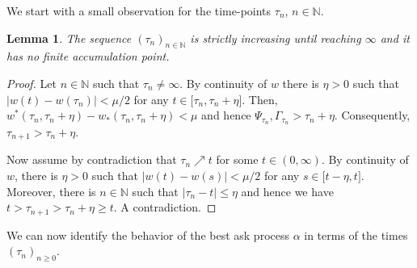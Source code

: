 \documentclass[11pt]{scrartcl}
\newtheorem{lemma}[theorem]{Lemma}
\begin{document}
We start with a small observation for the time-points $\tau_{n}$, $n\in%
\mathbb{N}$.

\begin{lemma}
The sequence $(\tau_{n})_{n\in\mathbb{N}}$ is strictly increasing until
reaching $\infty$ and it has no finite accumulation point.
\end{lemma}

\begin{proof}
Let $n\in\mathbb{N}$ such that $\tau_{n}\neq\infty$. By continuity of $w$ there
is $\eta>0$ such that $|w(t)-w(\tau_{n})|<\mu/2$ for any $t\in\lbrack \tau_{n}%
,\tau_{n}+\eta]$. Then, $w^{\ast}(\tau_{n},\tau_{n}+\eta)-w_{\ast}(\tau_{n},\tau_{n}%
+\eta)<\mu$ and hence $\Psi_{\tau_{n}},\Gamma_{\tau_{n}}>\tau_{n}+\eta$. Consequently,
$\tau_{n+1}>\tau_{n}+\eta$.

Now assume by contradiction that $\tau_{n}\nearrow t$ for some $t\in(0,\infty)$.
By continuity of $w$, there is $\eta>0$ such that $|w(t)-w(s)|<\mu/2$ for any
$s\in\lbrack t-\eta,t]$. Moreover, there is $n\in\mathbb{N}$ such that
$|\tau_{n}-t|\leq\eta$ and hence we have $t>\tau_{n+1}>\tau_{n}+\eta\geq t$. A contradiction.
\end{proof}
We can now identify the behavior of the best ask process $\alpha$ in terms
of the times $(\tau_n)_{n\geq 0}$.
\end{document}
